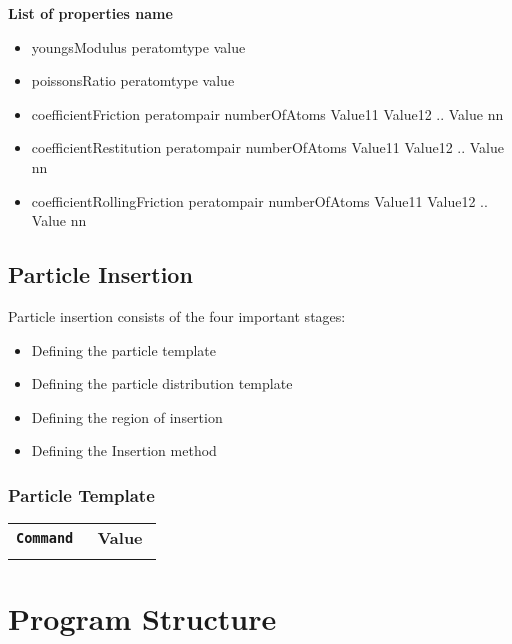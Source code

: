 \message{ !name(Cheatsheet.tex)}\documentclass[8pt]{extarticle} %
\begin{document}
\begin{multicols}{3}
  \textbf{List of properties name}
  \begin{itemize}
  \item youngsModulus peratomtype value
  \item poissonsRatio peratomtype value
  \item coefficientFriction peratompair numberOfAtoms Value11 Value12 .. Value nn
  \item coefficientRestitution peratompair numberOfAtoms Value11 Value12 .. Value nn
  \item coefficientRollingFriction peratompair numberOfAtoms Value11 Value12 .. Value nn
  \end{itemize}

  \subsection{Particle Insertion}
  Particle insertion consists of the four important stages:
  \begin{itemize}
  \item Defining the particle template
  \item Defining the particle distribution template
  \item Defining the region of insertion
  \item Defining the Insertion method
  \end{itemize}

\subsubsection{Particle Template}
\begin{tabular}{L{0.55\linewidth} L{0.45\linewidth}}
  \tt \textbf{Command} & \textbf{Value} \\
  \tt
\end{tabular}
  \vspace*{2ex}


  \section{Program Structure}


\end{multicols}
\end{document}
